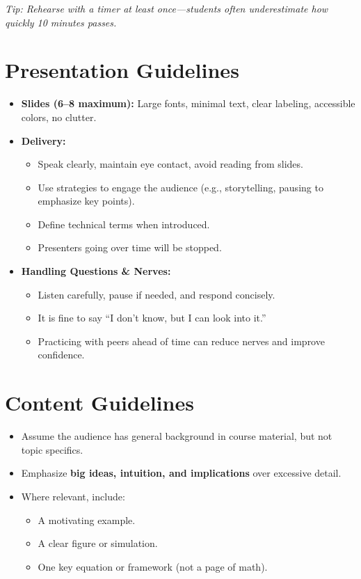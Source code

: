 \documentclass[11pt]{article}
\begin{document}
\textit{Tip: Rehearse with a timer at least once---students often underestimate how quickly 10 minutes passes.}

\section*{Presentation Guidelines}
\begin{itemize}
    \item \textbf{Slides (6--8 maximum):} Large fonts, minimal text, clear labeling, accessible colors, no clutter.
    \item \textbf{Delivery:}
    \begin{itemize}
        \item Speak clearly, maintain eye contact, avoid reading from slides.
        \item Use strategies to engage the audience (e.g., storytelling, pausing to emphasize key points).
        \item Define technical terms when introduced.
        \item Presenters going over time will be stopped.
    \end{itemize}
    \item \textbf{Handling Questions \& Nerves:}
    \begin{itemize}
        \item Listen carefully, pause if needed, and respond concisely.
        \item It is fine to say ``I don’t know, but I can look into it.''
        \item Practicing with peers ahead of time can reduce nerves and improve confidence.
    \end{itemize}
\end{itemize}

\section*{Content Guidelines}
\begin{itemize}
    \item Assume the audience has general background in course material, but not topic specifics.
    \item Emphasize \textbf{big ideas, intuition, and implications} over excessive detail.
    \item Where relevant, include:
    \begin{itemize}
        \item A motivating example.
        \item A clear figure or simulation.
        \item One key equation or framework (not a page of math).
    \end{itemize}
\end{itemize}
\end{document}
